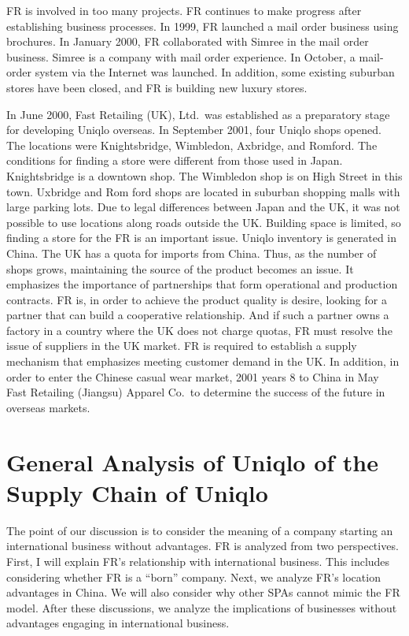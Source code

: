 \documentclass[12pt,a4paper]{article}
\begin{document}
FR is involved in too many projects. FR continues to make progress after
establishing business processes. In 1999, FR launched a mail order
business using brochures. In January 2000, FR collaborated with Simree
in the mail order business. Simree is a company with mail order
experience. In October, a mail-order system via the Internet was
launched. In addition, some existing suburban stores have been closed,
and FR is building new luxury stores.

In June 2000, Fast Retailing (UK), Ltd.~was established as a preparatory
stage for developing Uniqlo overseas. In September 2001, four Uniqlo
shops opened. The locations were Knightsbridge, Wimbledon, Axbridge, and
Romford. The conditions for finding a store were different from those
used in Japan. Knightsbridge is a downtown shop. The Wimbledon shop is
on High Street in this town. Uxbridge and Rom ford shops are located in
suburban shopping malls with large parking lots. Due to legal
differences between Japan and the UK, it was not possible to use
locations along roads outside the UK. Building space is limited, so
finding a store for the FR is an important issue. Uniqlo inventory is
generated in China. The UK has a quota for imports from China. Thus, as
the number of shops grows, maintaining the source of the product becomes
an issue. It emphasizes the importance of partnerships that form
operational and production contracts. FR is, in order to achieve the
product quality is desire, looking for a partner that can build a
cooperative relationship. And if such a partner owns a factory in a
country where the UK does not charge quotas, FR must resolve the issue
of suppliers in the UK market. FR is required to establish a supply
mechanism that emphasizes meeting customer demand in the UK. In
addition, in order to enter the Chinese casual wear market, 2001 years 8
to China in May Fast Retailing (Jiangsu) Apparel Co.~to determine the
success of the future in overseas markets.

\hypertarget{general-analysis-of-uniqlo-of-the-supply-chain-of-uniqlo}{%
\section{General Analysis of Uniqlo of the Supply Chain of
Uniqlo}\label{general-analysis-of-uniqlo-of-the-supply-chain-of-uniqlo}}

The point of our discussion is to consider the meaning of a company
starting an international business without advantages. FR is analyzed
from two perspectives. First, I will explain FR's relationship with
international business. This includes considering whether FR is a
``born'' company. Next, we analyze FR's location advantages in China. We
will also consider why other SPAs cannot mimic the FR model. After these
discussions, we analyze the implications of businesses without
advantages engaging in international business.
\end{document}
